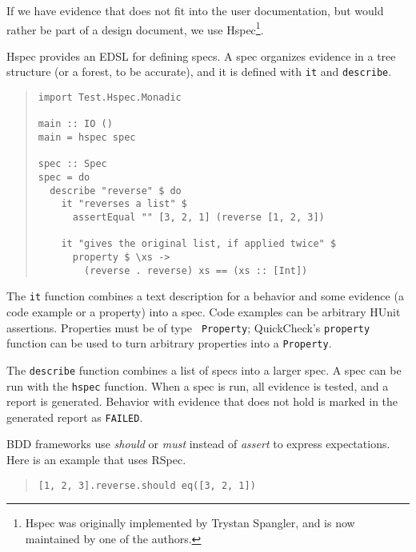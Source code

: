 \documentclass[preprint]{sigplanconf}
\begin{document}
If we have evidence that does not fit into the user documentation, but
would rather be part of a design document, we use Hspec\footnote{%
Hspec was originally implemented by Trystan Spangler, and is now
maintained by one of the authors.}.

Hspec provides an EDSL for defining specs.  A spec organizes evidence
in a tree structure (or a forest, to be accurate), and it is defined
with \texttt{it} and \texttt{describe}.

\begin{quote}
\small
\begin{verbatim}
import Test.Hspec.Monadic

main :: IO ()
main = hspec spec

spec :: Spec
spec = do
  describe "reverse" $ do
    it "reverses a list" $
      assertEqual "" [3, 2, 1] (reverse [1, 2, 3])

    it "gives the original list, if applied twice" $
      property $ \xs ->
        (reverse . reverse) xs == (xs :: [Int])
\end{verbatim}
\end{quote}

\noindent The {\tt it} function combines a text description for a
behavior and some evidence (a code example or a property) into a spec.
Code examples can be arbitrary HUnit assertions.  Properties must be of type {\tt
Property}; QuickCheck's \texttt{property} function can be used to turn
arbitrary properties into a \texttt{Property}.

The \texttt{describe} function combines a list of specs into a larger spec.
A spec can be run with the \texttt{hspec} function.  When a spec is
run, all evidence is tested, and a report is generated.
Behavior with evidence that does not hold is marked in the generated
report as {\tt FAILED}.

BDD frameworks use \emph{should} or \emph{must} instead of
\emph{assert} to express expectations.  Here is an example that uses
RSpec.

\begin{quote}
\small
\begin{verbatim}
[1, 2, 3].reverse.should eq([3, 2, 1])
\end{verbatim}
\end{quote}
\end{document}
